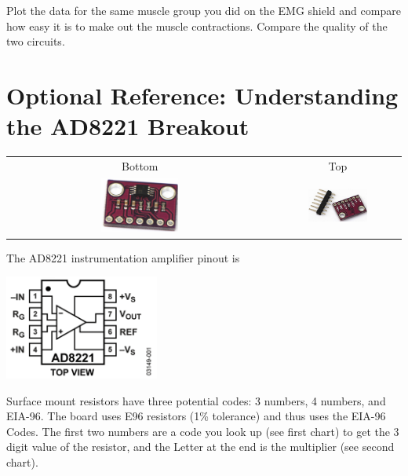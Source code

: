 

Plot the data for the same muscle group you did on the EMG shield and compare how easy it is to make out the muscle contractions.  Compare the quality of the two circuits.

\section{Optional Reference: Understanding the AD8221 Breakout}

\noindent
\begin{tabular}{cc}
Bottom & Top \\
\includegraphics[width=0.3\textwidth]{../images/InstAmpBreakoutBottom.jpg} &
\includegraphics[width=0.5\textwidth]{../images/InstAmpBreakoutTop.jpg}\\
\end{tabular}

The AD8221 instrumentation amplifier pinout is

\includegraphics[width=0.38\textwidth]{../images/AD8221-FBL.png}

Surface mount resistors have three potential codes: 3 numbers, 4 numbers, and EIA-96.  The board uses E96 resistors (1\% tolerance) and thus uses the EIA-96 Codes.  The first two numbers are a code you look up (see first chart) to get the 3 digit value of the resistor, and the Letter at the end is the multiplier (see second chart).

